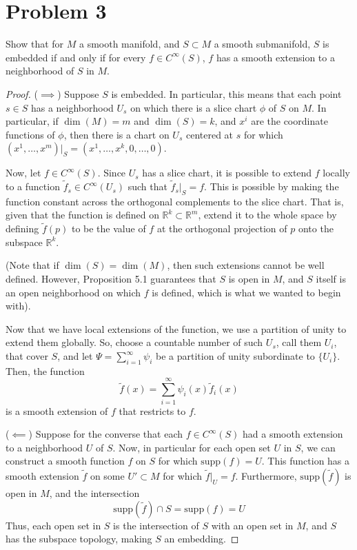 \documentclass[fontsize=11pt]{scrartcl} %
\numberwithin{equation}{section} %
\numberwithin{figure}{section} %
\numberwithin{table}{section} %
\newcommand{\R}{\mathbb{R}}
\begin{document}
\section*{Problem 3}
Show that for $M$ a smooth manifold, and $S\subset M$ a smooth submanifold, $S$
is embedded if and only if for every $f\in C^{\infty}(S)$, $f$ has a smooth
extension to a neighborhood of $S$ in $M$.
\\
\begin{proof}
    ($\implies$)
    Suppose $S$ is embedded. In particular, this means that each point $s\in S$
    has a neighborhood $U_s$ on which there is a slice chart $\phi$ of $S$ on
    $M$. In particular, if $\dim(M)=m$ and $\dim(S)=k$, and $x^i$ are the
    coordinate functions of $\phi$, then there is a chart on $U_s$ centered at
    $s$ for which $(x^1,\ldots,x^m)|_S = (x^1,\ldots,x^k,0,\ldots,0)$.

    Now, let $f\in C^{\infty}(S)$. Since $U_s$ has a slice chart, it is possible
    to extend $f$ locally to a function $\tilde{f}_s\in C^{\infty}(U_s)$ such
    that $\tilde{f}_s|_S = f$. This is possible by making the function constant
across the orthogonal complements to the slice chart. That is, given that the
function is defined on $\R^k\subset \R^m$, extend it to the whole space
by defining $\tilde{f}(p)$ to be the value of $f$ at the orthogonal projection of
$p$ onto the subspace $\R^k$.

    (Note that if $\dim(S)=\dim(M)$, then such extensions cannot be well defined. However,
    Proposition 5.1 guarantees that $S$ is open in $M$, and $S$ itself is an open
neighborhood on which $f$ is defined, which is what we wanted to begin with).

    Now that we have local extensions of the function, we use a partition of unity
to extend them globally. So, choose a countable number of such $U_s$, call them $U_i$, that cover
    $S$, and let $\Psi = \sum_{i=1}^{\infty}\psi_i$ be a partition of unity
    subordinate to $\{U_i\}$. Then, the function
    \[
        \tilde{f}(x) = \sum_{i=1}^{\infty}\psi_i(x)\tilde{f}_i(x)
    \]
    is a smooth extension of $f$ that restricts to $f$. 

    ($\impliedby$)
    Suppose for the converse that each $f\in C^{\infty}(S)$ had a smooth
    extension to a neighborhood $U$ of $S$. Now, in particular for each open set
    $U$ in $S$, we can construct a smooth function $f$ on $S$ for which
    $\textrm{supp}(f) = U$. This function has a smooth extension $\tilde{f}$ on some
    $U'\subset M$ for which $\tilde{f}|_U=f$. Furthermore,
    $\textrm{supp}(\tilde{f})$ is open in $M$, and the intersection
    \[
        \textrm{supp}(\tilde{f})\cap S = \textrm{supp}(f)=U
    \]
    Thus, each open set in $S$ is the intersection of $S$ with an open set in
    $M$, and $S$ has the subspace topology, making $S$ an embedding.
\end{proof}
\newpage
\end{document}
